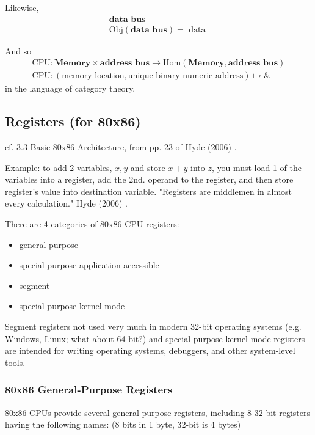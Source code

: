 \documentclass[10pt]{amsart}
\begin{document}
\begin{multicols*}{2}
Likewise, 
\[
\begin{gathered}
\textbf{data bus} \\
\text{Obj}{(\textbf{data bus})} = \text{ data } 
\end{gathered}
\]

And so
\[
\begin{gathered}
\text{CPU} : \textbf{Memory} \times \textbf{address bus} \to \text{Hom}{(\textbf{Memory} , \textbf{address bus}) } \\ 
	\text{CPU}: (\text{memory location} , \text{unique binary numeric address}) \mapsto \&
\end{gathered}
\]
in the language of category theory.  

\subsection{Registers (for 80x86)}  

cf. 3.3 Basic 80x86 Architecture, from pp. 23 of Hyde (2006) \cite{Hyde2006}.  

Example: to add 2 variables, $x,y$ and store $x+y$ into $z$, you must load 1 of the variables into a register, add the 2nd. operand to the register, and then store register's value into destination variable.  "Registers are middlemen in almost every calculation." Hyde (2006) \cite{Hyde2006}.  
    

 There are 4 categories of 80x86 CPU registers: 
 \begin{itemize}
 	\item general-purpose
 	\item special-purpose application-accessible
 	\item segment
 	\item special-purpose kernel-mode
 \end{itemize}
Segment registers not used very much in modern 32-bit operating systems (e.g. Windows, Linux; what about 64-bit?) and special-purpose kernel-mode registers are intended for writing operating systems, debuggers, and other system-level tools.  

\subsubsection{80x86 General-Purpose Registers}  

80x86 CPUs provide several general-purpose registers, including 8 32-bit registers having the following names: (8 bits in 1 byte, 32-bit is 4 bytes)


\end{multicols*}
\end{document}
